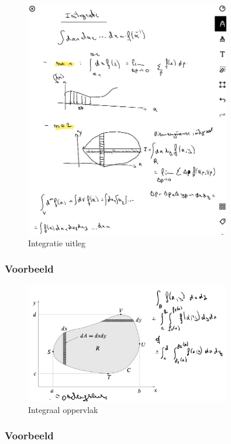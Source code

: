 \documentclass[a4paper]{report}
\begin{document}
\begin{figure}[H]
	\centering
	\includegraphics[width=0.8\textwidth]{assets/integralen_uitleg.png}
	\caption{Integratie uitleg}
	\label{fig:integralen_uitleg}
\end{figure}

\subsubsection{Voorbeeld}


\begin{figure}[H]
	\centering
	\includegraphics[width=0.8\textwidth]{assets/integraal_oppervalk.png}
	\caption{Integraal oppervlak}
	\label{fig:integraal_oppervalk}
\end{figure}


\subsubsection{Voorbeeld}
\end{document}
